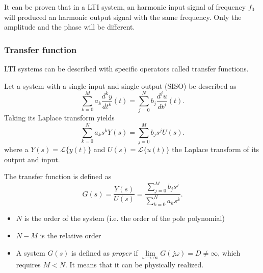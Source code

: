 It can be proven that in a LTI system, an harmonic input signal of frequency $f_0$ will produced an harmonic output signal with the same frequency. Only the amplitude and the phase will be different.

\subsubsection{Transfer function}
LTI systems can be described with specific operators called transfer functions.

Let a system with a single input and single output (SISO) be described as 
\begin{equation}
	\label{eq:controlth_diff_eq}
	\sum\limits_{k=0}^M a_k \frac{d^k y}{dt^k}(t) = \sum\limits_{j=0}^N b_j \frac{d^j u}{dt^j}(t).
\end{equation}
Taking its Laplace transform yields
\begin{equation}
\sum\limits_{k=0}^N a_k s^k Y(s) = \sum\limits_{j=0}^M b_j s^j U(s).
\end{equation}
where a $Y(s) = \mathcal{L}\{y(t)\}$ and $U(s) = \mathcal{L}\{u(t)\}$ the Laplace transform of its output and input.

The transfer function is defined as
\begin{equation}
	\label{eq:controlth_tf}
	G(s) = \frac{Y(s)}{U(s)} = \frac{\sum\limits_{j=0}^M b_j s^j}{\sum\limits_{k=0}^N a_k s^k}.
\end{equation}

\begin{itemize}
	\item $N$ is the order of the system (i.e. the order of the pole polynomial) 
	\item $N-M$ is the relative order
	\item A system $G(s)$ is defined as \emph{proper} if $\lim\limits_{\omega \rightarrow \infty} G(j\omega) = D \neq \infty$, which requires $M < N$. It means that it can be physically realized.
\end{itemize}

